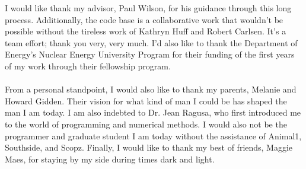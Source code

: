 

I would like thank my advisor, Paul Wilson, for his guidance through this long
process. Additionally, the \Cyclus code base is a collaborative work that
wouldn't be possible without the tireless work of Kathryn Huff and Robert
Carlsen. It's a team effort; thank you very, very much. I'd also like to thank
the Department of Energy's Nuclear Energy University Program for their funding
of the first years of my work through their fellowship program.
\\ \\
From a personal standpoint, I would also like to thank my parents, Melanie and
Howard Gidden. Their vision for what kind of man I could be has shaped the man I
am today. I am also indebted to Dr. Jean Ragusa, who first introduced me to the
world of programming and numerical methods. I would also not be the programmer
and graduate student I am today without the assistance of Animal1, Southside,
and Scopz. Finally, I would like to thank my best of friends, Maggie Maes, for
staying by my side during times dark and light.
